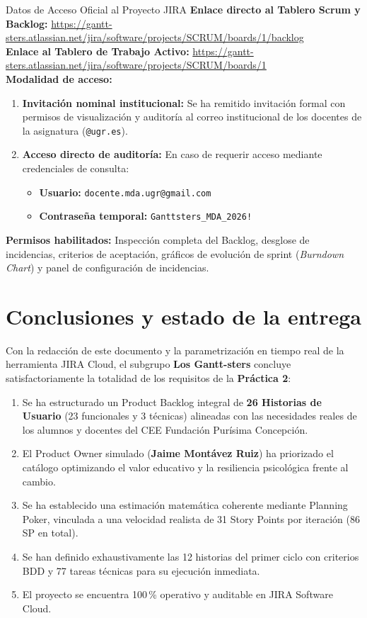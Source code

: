 \documentclass[11pt,a4paper]{article}
\newcommand{\hl}[1]{\textcolor{gblue}{\textbf{#1}}}
\begin{document}
\begin{verde}{Datos de Acceso Oficial al Proyecto JIRA}
\textbf{Enlace directo al Tablero Scrum y Backlog:} \url{https://gantt-sters.atlassian.net/jira/software/projects/SCRUM/boards/1/backlog}\\
\textbf{Enlace al Tablero de Trabajo Activo:} \url{https://gantt-sters.atlassian.net/jira/software/projects/SCRUM/boards/1}\\
\textbf{Modalidad de acceso:}
\begin{enumerate}[leftmargin=1.6em,itemsep=2pt]
\item \textbf{Invitación nominal institucional:} Se ha remitido invitación formal con permisos de visualización y auditoría al correo institucional de los docentes de la asignatura (\texttt{@ugr.es}).
\item \textbf{Acceso directo de auditoría:} En caso de requerir acceso mediante credenciales de consulta:
\begin{itemize}
\item \textbf{Usuario:} \texttt{docente.mda.ugr@gmail.com}
\item \textbf{Contraseña temporal:} \texttt{Ganttsters\_MDA\_2026!}
\end{itemize}
\end{enumerate}
\textbf{Permisos habilitados:} Inspección completa del Backlog, desglose de incidencias, criterios de aceptación, gráficos de evolución de sprint (\textit{Burndown Chart}) y panel de configuración de incidencias.
\end{verde}

\section{Conclusiones y estado de la entrega}
Con la redacción de este documento y la parametrización en tiempo real de la herramienta JIRA Cloud, el subgrupo \hl{Los Gantt-sters} concluye satisfactoriamente la totalidad de los requisitos de la \textbf{Práctica 2}:

\begin{enumerate}[leftmargin=1.6em,itemsep=2pt]
\item Se ha estructurado un Product Backlog integral de \textbf{26 Historias de Usuario} (23 funcionales y 3 técnicas) alineadas con las necesidades reales de los alumnos y docentes del CEE Fundación Purísima Concepción.
\item El Product Owner simulado (\textbf{Jaime Montávez Ruiz}) ha priorizado el catálogo optimizando el valor educativo y la resiliencia psicológica frente al cambio.
\item Se ha establecido una estimación matemática coherente mediante Planning Poker, vinculada a una velocidad realista de 31 Story Points por iteración (86 SP en total).
\item Se han definido exhaustivamente las 12 historias del primer ciclo con criterios BDD y 77 tareas técnicas para su ejecución inmediata.
\item El proyecto se encuentra 100\,\% operativo y auditable en JIRA Software Cloud.
\end{enumerate}
\end{document}
